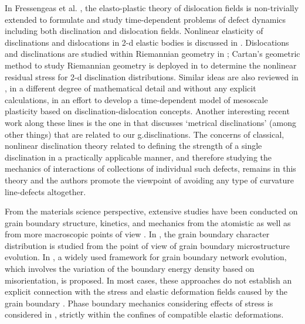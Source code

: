 \documentclass[11pt,letterpaper]{article}
\begin{document}
In Fressengeas et al. \cite{fressengeas2011elasto}, the elasto-plastic theory of dislocation fields \cite{acharya2001model} is non-trivially extended to formulate and study time-dependent problems of defect dynamics including both disclination and dislocation fields. Nonlinear elasticity of disclinations and dislocations in 2-d elastic bodies is discussed in \cite{zubov1997nonlinear,derezin2011disclinations}. Dislocations and disclinations are studied within Riemannian geometry in \cite{kupferman2015metric}; Cartan's geometric method to study Riemannian geometry is deployed in \cite{yavari2012riemann} to determine the nonlinear residual stress for 2-d disclination distributions. Similar ideas are also reviewed in \cite{clayton2006modeling}, in a different degree of mathematical detail and without any explicit calculations, in an effort to develop a time-dependent model of mesoscale plasticity based on disclination-dislocation concepts. Another interesting recent work along these lines is the one in \cite{roychowdhury_gupta} that discusses `metrical disclinations' (among other things) that are related to our g.disclinations. The concerns of classical, nonlinear disclination theory related to defining the strength of a single disclination in a practically applicable manner, and therefore studying the mechanics of interactions of collections of individual such defects, remains in this theory and the authors promote the viewpoint of avoiding any type of curvature line-defects altogether.


From the materials science perspective, extensive studies have been conducted on grain boundary structure, kinetics, and  mechanics from the atomistic \cite{sutton1983structure1, sutton1983structure2} as well as from more macroscopic points of view \cite{mullins1956two,cahn2006coupling,cahn1982transitions}. In \cite{kim2006grain,saylor2004distribution, rohrer2010introduction, rohrer2011grain}, the grain boundary character distribution is studied from the point of view of grain boundary microstructure evolution. In \cite{kinderlehrer2006variational, elsey2009diffusion}, a widely used framework for grain boundary network evolution, which involves the variation of the boundary energy density based on misorientation, is proposed. In most cases, these approaches do not establish an explicit connection with the stress and elastic deformation fields caused by the grain boundary \cite{holm2001misorientation}. Phase boundary mechanics considering effects of stress is considered in \cite{porta2013heterogeneity,  agrawal2015dynamic}, strictly within the confines of compatible elastic deformations.
\end{document}

